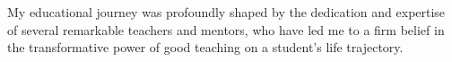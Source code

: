 My educational journey was profoundly shaped by the dedication and expertise of several remarkable teachers and mentors, who have led me to a
firm belief in the transformative power of good teaching on a student's life trajectory.